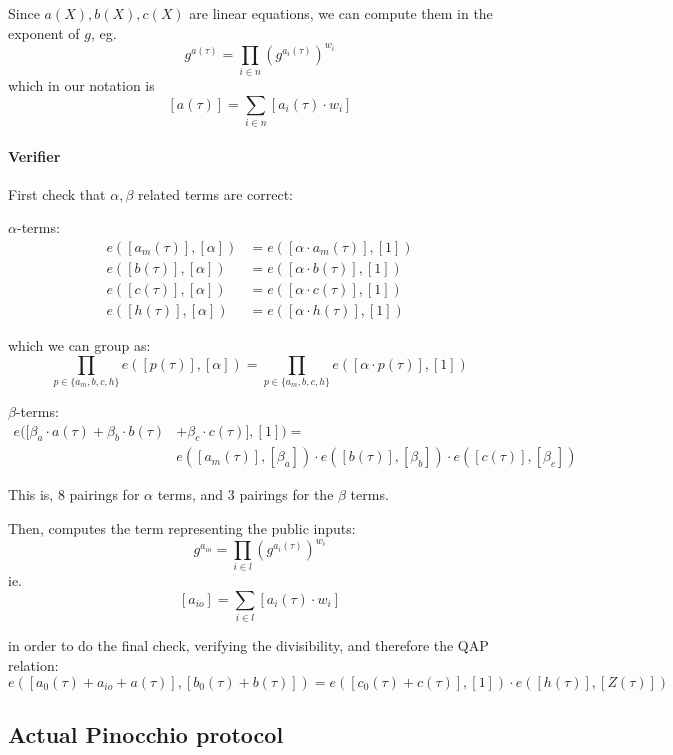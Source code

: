 \documentclass{article}
\begin{document}
Since $a(X), b(X), c(X)$ are linear equations, we can compute them in the exponent of $g$, eg.
$$g^{a(\tau)} = \prod_{i \in n} (g^{a_i(\tau)})^{w_i}$$
which in our notation is
$$[a(\tau)] = \sum_{i \in n} [a_i(\tau) \cdot w_i]$$

\paragraph{Verifier}

First check that $\alpha, \beta$ related terms are correct:

$\alpha$-terms:
\begin{align*}
    e([a_m(\tau)], [\alpha]) &= e([\alpha \cdot a_m(\tau)], [1])\\
    e([b(\tau)], [\alpha]) &= e([\alpha \cdot b(\tau)], [1])\\
    e([c(\tau)], [\alpha]) &= e([\alpha \cdot c(\tau)], [1])\\
    e([h(\tau)], [\alpha]) &= e([\alpha \cdot h(\tau)], [1])
\end{align*}

which we can group as:
$$\prod_{p \in \{a_m, b, c, h\}} e([p(\tau)], [\alpha]) = \prod_{p \in \{a_m, b, c, h\}} e([\alpha \cdot p(\tau)], [1])$$

$\beta$-terms:
\begin{align*}
    e([ \beta_a \cdot a(\tau) + \beta_b \cdot b(\tau) &+ \beta_c \cdot c(\tau)], [1]) =\\
			      &e([a_m(\tau)], [\beta_a]) \cdot e([b(\tau)], [\beta_b]) \cdot e([c(\tau)], [\beta_c])
\end{align*}

This is, 8 pairings for $\alpha$ terms, and 3 pairings for the $\beta$ terms.

Then, computes the term representing the public inputs:
$$g^{a_{io}} = \prod_{i \in l} (g^{a_i(\tau)})^{w_i}$$
ie.
$$[a_{io}] = \sum_{i \in l} [a_i(\tau) \cdot w_i]$$

in order to do the final check, verifying the divisibility, and therefore the QAP relation:
$$e([a_0(\tau) + a_{io} + a(\tau)], [b_0(\tau) + b(\tau)]) = e([c_0(\tau) + c(\tau)], [1]) \cdot e([h(\tau)], [Z(\tau)])$$


\vspace{1.0cm}
\subsection{Actual Pinocchio protocol}
\end{document}
